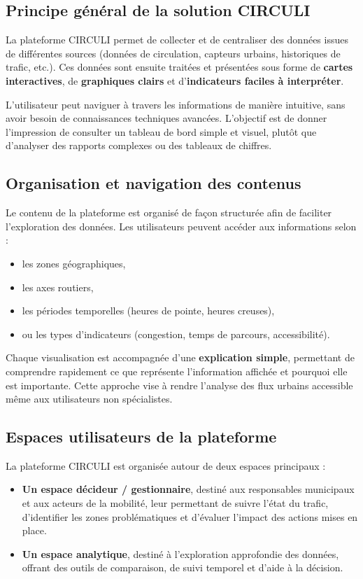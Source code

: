 \subsection{Principe général de la solution CIRCULI}
La plateforme CIRCULI permet de collecter et de centraliser des données issues de différentes sources (données de circulation, capteurs urbains, historiques de trafic, etc.). Ces données sont ensuite traitées et présentées sous forme de \textbf{cartes interactives}, de \textbf{graphiques clairs} et d'\textbf{indicateurs faciles à interpréter}.

L'utilisateur peut naviguer à travers les informations de manière intuitive, sans avoir besoin de connaissances techniques avancées. L'objectif est de donner l'impression de consulter un tableau de bord simple et visuel, plutôt que d'analyser des rapports complexes ou des tableaux de chiffres.

\subsection{Organisation et navigation des contenus}
Le contenu de la plateforme est organisé de façon structurée afin de faciliter l'exploration des données. Les utilisateurs peuvent accéder aux informations selon :
\begin{itemize}
    \item les zones géographiques,
    \item les axes routiers,
    \item les périodes temporelles (heures de pointe, heures creuses),
    \item ou les types d'indicateurs (congestion, temps de parcours, accessibilité).
\end{itemize}

Chaque visualisation est accompagnée d'une \textbf{explication simple}, permettant de comprendre rapidement ce que représente l'information affichée et pourquoi elle est importante. Cette approche vise à rendre l'analyse des flux urbains accessible même aux utilisateurs non spécialistes.

\subsection{Espaces utilisateurs de la plateforme}
La plateforme CIRCULI est organisée autour de deux espaces principaux :
\begin{itemize}
    \item \textbf{Un espace décideur / gestionnaire}, destiné aux responsables municipaux et aux acteurs de la mobilité, leur permettant de suivre l'état du trafic, d'identifier les zones problématiques et d'évaluer l'impact des actions mises en place.
    \item \textbf{Un espace analytique}, destiné à l'exploration approfondie des données, offrant des outils de comparaison, de suivi temporel et d'aide à la décision.
\end{itemize}

